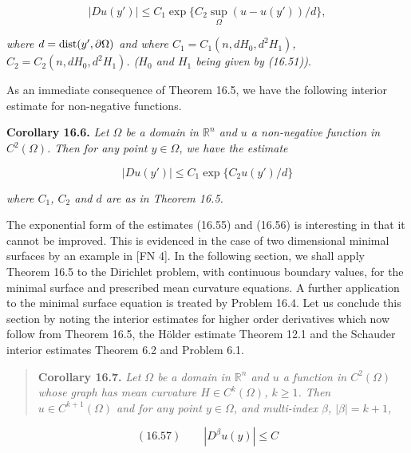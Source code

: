 \begin{equation}\tag{16.55}
|Du(y')|\le C_1 \exp\{C_2 \sup_{\Omega}(u-u(y'))/d\},
\end{equation}

\textit{where $d=\operatorname{dist}(y',\partial\Omega)$ and where $C_1=C_1(n,dH_0,d^2H_1)$, $C_2=C_2(n,dH_0,d^2H_1)$.
($H_0$ and $H_1$ being given by (16.51)).}

\medskip

As an immediate consequence of Theorem 16.5, we have the following interior
estimate for non-negative functions.

\medskip

\noindent\textbf{Corollary 16.6.} \textit{Let $\Omega$ be a domain in $\mathbb{R}^n$ and $u$ a non-negative function in $C^2(\Omega)$.
Then for any point $y \in \Omega$, we have the estimate}

\begin{equation}\tag{16.56}
|Du(y')|\le C_1 \exp\{C_2u(y')/d\}
\end{equation}

\textit{where $C_1$, $C_2$ and $d$ are as in Theorem 16.5.}

\medskip

The exponential form of the estimates (16.55) and (16.56) is interesting in that it
cannot be improved. This is evidenced in the case of two dimensional minimal
surfaces by an example in [FN 4]. In the following section, we shall apply Theorem
16.5 to the Dirichlet problem, with continuous boundary values, for the minimal
surface and prescribed mean curvature equations. A further application to the
minimal surface equation is treated by Problem 16.4. Let us conclude this section
by noting the interior estimates for higher order derivatives which now follow
from Theorem 16.5, the Hölder estimate Theorem 12.1 and the Schauder interior
estimates Theorem 6.2 and Problem 6.1.



\begin{quote}
\textbf{Corollary 16.7.} \emph{Let $\Omega$ be a domain in $\mathbb{R}^n$ and $u$ a function in $C^2(\Omega)$ whose graph has mean curvature $H \in C^k(\Omega)$, $k \geq 1$. Then $u \in C^{k+1}(\Omega)$ and for any point $y \in \Omega$, and multi-index $\beta$, $|\beta| = k + 1$,}
\end{quote}

\begin{equation}
(16.57)\qquad |D^\beta u(y)| \leq C
\end{equation}

